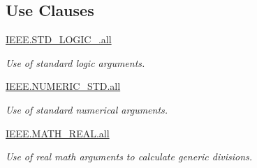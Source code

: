 \subsection*{Use Clauses}
 \begin{DoxyCompactItemize}
\item 
\hypertarget{classclk__divide_a68c233289eaf7d2601307bdd93b4c299}{\hyperlink{classclk__divide_a68c233289eaf7d2601307bdd93b4c299}{I\-E\-E\-E.\-S\-T\-D\-\_\-\-L\-O\-G\-I\-C\-\_.\-all}   }\label{classclk__divide_a68c233289eaf7d2601307bdd93b4c299}

\begin{DoxyCompactList}\small\item\em Use of standard logic arguments. \end{DoxyCompactList}\item 
\hypertarget{classclk__divide_a7c135c43c66ccd7f22abe5f6211788a5}{\hyperlink{classclk__divide_a7c135c43c66ccd7f22abe5f6211788a5}{I\-E\-E\-E.\-N\-U\-M\-E\-R\-I\-C\-\_\-\-S\-T\-D.\-all}   }\label{classclk__divide_a7c135c43c66ccd7f22abe5f6211788a5}

\begin{DoxyCompactList}\small\item\em Use of standard numerical arguments. \end{DoxyCompactList}\item 
\hypertarget{classclk__divide_a8284ebf76bf629c58adbf8d637e8328b}{\hyperlink{classclk__divide_a8284ebf76bf629c58adbf8d637e8328b}{I\-E\-E\-E.\-M\-A\-T\-H\-\_\-\-R\-E\-A\-L.\-all}   }\label{classclk__divide_a8284ebf76bf629c58adbf8d637e8328b}

\begin{DoxyCompactList}\small\item\em Use of real math arguments to calculate generic divisions. \end{DoxyCompactList}\end{DoxyCompactItemize}
